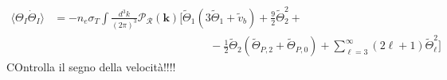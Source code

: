 \begin{align}
    \langle\Theta_I\dot \Theta_I\rangle&=-n_e\sigma_T\int\frac{d^3k}{(2\pi)^3}\mathcal{P}_\mathcal{R} (\mathbf{k})\bigg[\tilde\Theta_1( 3\tilde\Theta_1+\tilde v_b)+\frac{9}{2}\tilde\Theta_2^2+\nonumber\\&\qquad\qquad\qquad\qquad\qquad\qquad\qquad-\frac{1}{2}\tilde\Theta_2(\tilde\Theta_{P,2}+\tilde\Theta_{P,0})+\sum_{\ell=3}^{\infty}(2\ell+1)\tilde\Theta_\ell^2\bigg]
    \label{eq:TT_I_average_scalar}
\end{align}
COntrolla il segno della velocità!!!!
